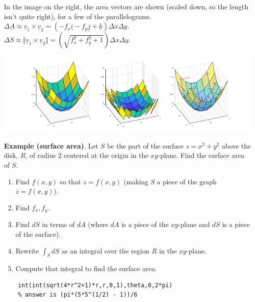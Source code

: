 \documentclass[12pt,letterpaper,noanswers]{exam}
\newcommand{\mb}[1]{\underline{#1}}
\begin{document}
In the image on the right, the area vectors are shown (scaled down, so the length isn't quite right), for a few of the parallelograms.  $\Delta \mb A \approx \mb v_1\times \mb v_2 = (-f_x\mb i - f_y\mb j + \mb k)\Delta x\Delta y$.  $\Delta S \approx \Vert \mb v_1 \times \mb v_2\Vert = \left(\sqrt{f_x^2+f_y^2+1}\right)\Delta x\Delta y$.

\includegraphics[width=1\linewidth]{img/C30p4-18.png}

\noindent\textbf{Example (surface area)}.  Let $S$ be the part of the surface $z = x^2+y^2$ above the disk, $R$, of radius $2$ centered at the origin in the $xy$-plane.  Find the surface area of $S$.

\begin{enumerate}
\itemsep3em
    \item Find $f(x,y)$ so that $z = f(x,y)$ (making $S$ a piece of the graph $z = f(x,y)$). %
    \item Find $f_x, f_y$.  %
    \item Find $dS$ in terms of $dA$ (where $dA$ is a piece of the $xy$-plane and $dS$ is a piece of the surface).  %
    \item Rewrite $\int_S dS$ as an integral over the region $R$ in the $xy$-plane. %
    \item Compute that integral to find the surface area.  %
    \vspace{1in}
    
    
\end{enumerate}
\begin{verbatim}
    int(int(sqrt(4*r^2+1)*r,r,0,1),theta,0,2*pi)
    % answer is (pi*(5*5^(1/2) - 1))/6
    \end{verbatim}
\end{document}
